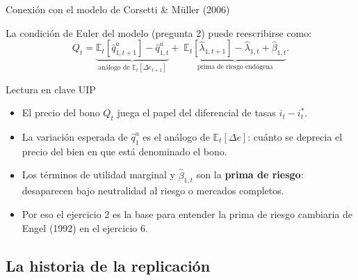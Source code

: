 \begin{frame}{Conexión con el modelo de Corsetti \& Müller (2006)}

  La condición de Euler del modelo (pregunta 2) puede reescribirse como:
  \[
    Q_t = \underbrace{\mathbb{E}_t[\hat{q}^a_{1,t+1}] - \hat{q}^a_{1,t}}_{\text{análogo de } \mathbb{E}_t[\Delta e_{t+1}]}
    +\; \underbrace{\mathbb{E}_t[\hat{\lambda}_{1,t+1}] - \hat{\lambda}_{1,t}
    + \hat{\beta}_{1,t}}_{\text{prima de riesgo endógena}}.
  \]

  \bigskip
  \begin{block}{Lectura en clave UIP}
    \begin{itemize}
      \item El precio del bono $Q_t$ juega el papel del diferencial de tasas $i_t - i^*_t$.
      \item La variación esperada de $\hat{q}^a_1$ es el análogo de $\mathbb{E}_t[\Delta e]$:
            cuánto se deprecia el precio del bien en que está denominado el bono.
      \item Los términos de utilidad marginal y $\hat{\beta}_{1,t}$ son la \textbf{prima de
            riesgo}: desaparecen bajo neutralidad al riesgo o mercados completos.
      \item Por eso el ejercicio 2 es la base para entender la prima de riesgo cambiaria
            de Engel (1992) en el ejercicio 6.
    \end{itemize}
  \end{block}

\end{frame}

\subsection{La historia de la replicación}

